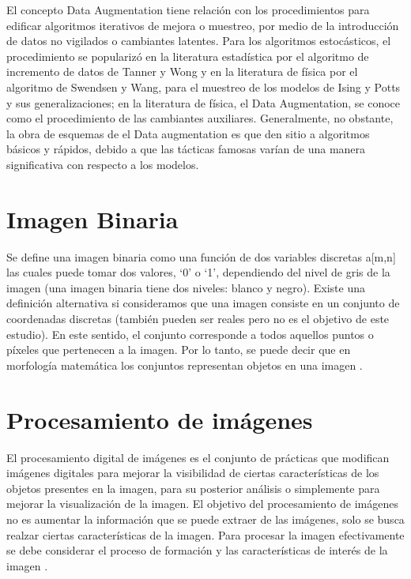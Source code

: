 El concepto Data Augmentation tiene relación con los procedimientos para edificar algoritmos iterativos de mejora o muestreo, por medio de la introducción de datos no vigilados o cambiantes latentes. Para los algoritmos estocásticos, el procedimiento se popularizó en la literatura estadística por el algoritmo de incremento de datos de Tanner y Wong y en la literatura de física por el algoritmo de Swendsen y Wang, para el muestreo de los modelos de Ising y Potts y sus generalizaciones; en la literatura de física, el Data Augmentation, se conoce como el procedimiento de las cambiantes auxiliares. Generalmente, no obstante, la obra de esquemas de el Data augmentation es que den sitio a algoritmos básicos y rápidos, debido a que las tácticas famosas varían de una manera significativa con respecto a los modelos.\cite{van2001art}


\section{Imagen Binaria} Se define una imagen binaria como una función de dos variables discretas
a[m,n] las cuales puede tomar dos valores, ‘0’ o ‘1’, dependiendo del nivel de gris de la
imagen (una imagen binaria tiene dos niveles: blanco y negro). Existe una definición alternativa si consideramos que una imagen consiste en un conjunto de
coordenadas discretas (también pueden ser reales pero no es el objetivo de este estudio). En este sentido, el conjunto corresponde a todos aquellos puntos o píxeles que pertenecen a la imagen. Por lo tanto, se puede decir que en morfología matemática los conjuntos representan objetos en una imagen \cite{ref_12}.



\section{Procesamiento de imágenes} El procesamiento digital de imágenes es el conjunto de prácticas que modifican imágenes digitales para mejorar la visibilidad de ciertas características de los objetos presentes en la imagen, para su posterior análisis o simplemente para mejorar la visualización de la
imagen.
El objetivo del procesamiento de imágenes no es aumentar la información que se puede extraer de las imágenes, solo se busca realzar ciertas características de la imagen. Para procesar la imagen efectivamente se debe considerar el proceso de formación y las características de interés de la imagen \cite{ref_13}.
\\ 
 
